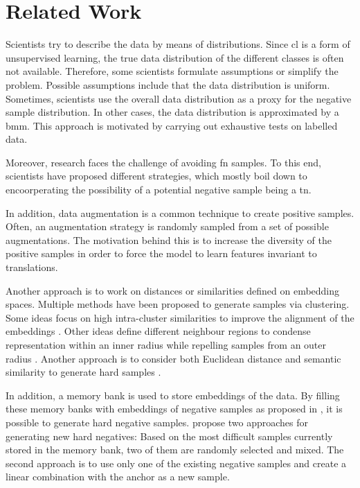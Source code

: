 \section{Related Work}\label{sec:related_work}

Scientists try to describe the data by means of distributions.
Since \ac{cl} is a form of unsupervised learning, the true data distribution of the different classes is often not available.
Therefore, some scientists formulate assumptions or simplify the problem.
Possible assumptions include that the data distribution is uniform. 
Sometimes, scientists use the overall data distribution as a proxy for the negative sample distribution.
In other cases, the data distribution is approximated by a \ac{bmm}.
This approach is motivated by carrying out exhaustive tests on labelled data.

Moreover, research faces the challenge of avoiding \ac{fn} samples.
To this end, scientists have proposed different strategies, which mostly boil down to 
encoorperating the possibility of a potential negative sample being a \ac{tn}.


In addition, data augmentation is a common technique to create positive samples.
Often, an augmentation strategy is randomly sampled from a set of possible augmentations.
The motivation behind this is to increase the diversity of the positive samples 
in order to force the model to learn features invariant to translations.


Another approach is to work on distances or similarities defined on embedding spaces.
Multiple methods have been proposed to generate samples via clustering.
Some ideas focus on high intra-cluster similarities to improve the alignment of the embeddings \citet{DRC_2020}.
Other ideas define different neighbour regions to condense representation within an inner radius 
while repelling samples from an outer radius \citet{local_aggr_2019}.
Another approach is to consider both Euclidean distance and semantic similarity to generate hard samples \citet{mining_manifolds_2018}.
\citet{PCL_2021}


In addition, a memory bank is used to store embeddings of the data.
By filling these memory banks with embeddings of negative samples as proposed in \citet{mochi_2020}, 
it is possible to generate hard negative samples.
\citeauthor{mochi_2020} propose two approaches for generating new hard negatives: 
Based on the most difficult samples currently stored in the memory bank, two of them are randomly selected and mixed.
The second approach is to use only one of the existing negative samples and create a linear combination with the anchor as a new sample.


